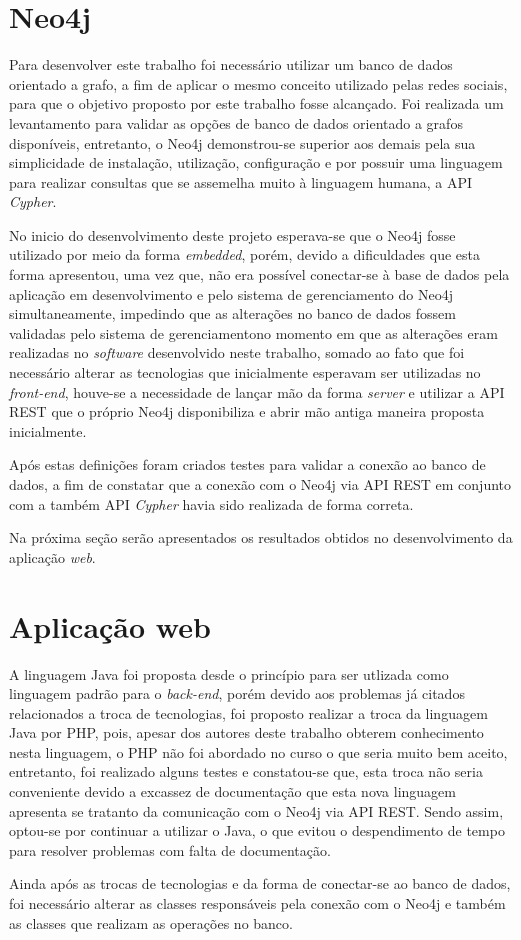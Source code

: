 \section{Neo4j}

\par Para desenvolver este trabalho foi necessário utilizar um banco de dados orientado a grafo, a fim de aplicar o mesmo conceito utilizado pelas redes sociais, para que o objetivo proposto por este trabalho fosse alcançado. Foi realizada um levantamento para validar as opções de banco de dados orientado a grafos disponíveis, entretanto, o Neo4j demonstrou-se superior aos demais pela sua simplicidade de instalação, utilização, configuração e por possuir uma linguagem para realizar consultas que se assemelha muito à linguagem humana, a API \textit{Cypher}.

\par No inicio do desenvolvimento deste projeto esperava-se que o Neo4j fosse utilizado por meio da forma \textit{embedded}, porém, devido a dificuldades que esta forma apresentou, uma vez que, não era possível conectar-se à base de dados pela aplicação em desenvolvimento e pelo sistema de gerenciamento do Neo4j simultaneamente, impedindo que as alterações no banco de dados fossem validadas pelo sistema de gerenciamentono momento em que as alterações eram realizadas no \textit{software} desenvolvido neste trabalho, somado ao fato que foi necessário alterar as tecnologias que inicialmente esperavam ser utilizadas no \textit{front-end}, houve-se a necessidade de lançar mão da forma \textit{server} e utilizar a API REST que o próprio Neo4j disponibiliza e abrir mão antiga maneira proposta inicialmente.

\par Após estas definições foram criados testes para validar a conexão ao banco de dados, a fim de constatar que a conexão com o Neo4j via API REST em conjunto com a também API \textit{Cypher} havia sido realizada de forma correta.

\par Na próxima seção serão apresentados os resultados obtidos no desenvolvimento da aplicação \textit{web}.

\section{Aplicação web}

\par A linguagem Java foi proposta desde o princípio para ser utlizada como linguagem padrão para o \textit{back-end}, porém devido aos problemas já citados relacionados a troca de tecnologias, foi proposto realizar a troca da linguagem Java por PHP, pois, apesar dos autores deste trabalho obterem conhecimento nesta linguagem, o PHP não foi abordado no curso o que seria muito bem aceito, entretanto, foi realizado alguns testes e constatou-se que, esta troca não seria conveniente devido a excassez de documentação que esta nova linguagem apresenta se tratanto da comunicação com o Neo4j via API REST. Sendo assim, optou-se por continuar a utilizar o Java, o que evitou o despendimento de tempo para resolver problemas com falta de documentação.

\par Ainda após as trocas de tecnologias e  da forma de conectar-se ao banco de dados, foi necessário alterar as classes responsáveis pela conexão com o Neo4j e também as classes que realizam as operações no banco. 

